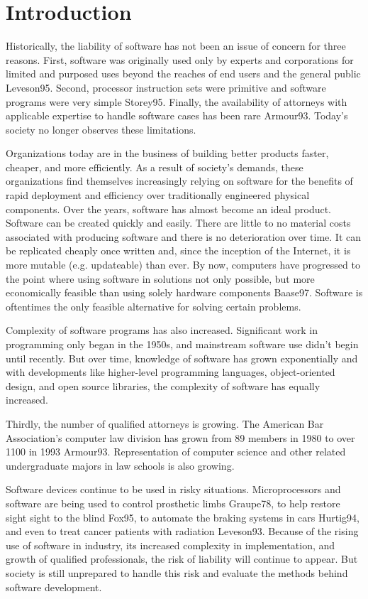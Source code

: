 \chapter{Introduction}

Historically, the liability of software has not been an issue of
concern for three reasons. First, software was originally used only by experts
and corporations for limited and purposed uses beyond the reaches of end
users and the general public \cite{refs}{Leveson95}. Second, processor instruction 
sets were primitive and software programs were very simple \cite{refs}{Storey95}. 
Finally, the availability of attorneys with applicable expertise to handle 
software cases has been rare \cite{refs}{Armour93}. Today's society no longer observes
these limitations.

Organizations today are in the business of building better products faster,
cheaper, and more efficiently. As a result of society's demands, these
organizations find themselves increasingly relying on software for the benefits
of rapid deployment and efficiency over traditionally engineered physical
components. Over the years, software has almost become an ideal product.
Software can be created quickly and easily. There are little to no material
costs associated with producing software and there is no deterioration over
time. It can be replicated cheaply once written and, since the inception of the
Internet, it is more mutable (e.g. updateable) than ever. By now, computers
have progressed to the point where using software in solutions not only
possible, but more economically feasible than using solely hardware components 
\cite{refs}{Baase97}. Software is oftentimes the only feasible alternative for solving
certain problems.

Complexity of software programs has also increased. Significant work in
programming only began in the 1950s, and mainstream software use didn't begin
until recently. But over time, knowledge of software has grown exponentially
and with developments like higher-level programming languages, object-oriented
design, and open source libraries, the complexity of software has equally
increased.

Thirdly, the number of qualified attorneys is growing. The American Bar 
Association's computer law division has grown from 89 members in 1980 to over 
1100 in 1993 \cite{refs}{Armour93}. Representation of computer science and other
related undergraduate majors in law schools is also growing.

Software devices continue to be used in risky situations. Microprocessors and
software are being used to control prosthetic limbs \cite{refs}{Graupe78}, to help
restore sight sight to the blind \cite{refs}{Fox95}, to automate the braking systems
in cars \cite{refs}{Hurtig94}, and even to treat cancer patients with radiation
\cite{refs}{Leveson93}. Because of the rising use of software in industry, its
increased complexity in implementation, and growth of qualified professionals,
the risk of liability will continue to appear. But society is still unprepared
to handle this risk and evaluate the methods behind software development.

